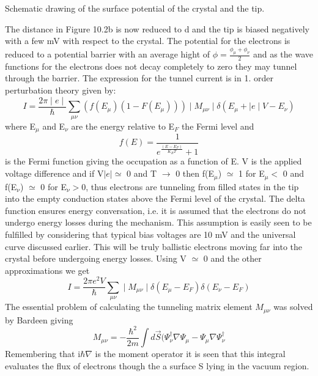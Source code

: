 \vspace*{11cm}

 Schematic drawing of the surface potential of the crystal and the tip.

\vspace{1cm}




The  distance in Figure 10.2b is now reduced to d and the tip is biased negatively with a few mV with respect to the crystal.
The potential for the electrons is reduced to a potential barrier with an average hight of $\phi = \frac{\phi_{\mu}   + \phi_{\nu}}{2}$ and as the wave functions for the electrons does not decay completely to zero they  may tunnel through the barrier. The expression for the tunnel current is in 1. order perturbation theory given by:
\begin{equation}
I=\frac{2\pi \mid e\mid }{\hbar}\sum_{\mu \nu}(f(E_\mu)(1-F(E_\mu)))\mid M_{\mu \nu} \mid  \delta (E_\mu + \mid e \mid V - E_\nu)
\end{equation}
where E$_{\mu}$ and E$_{\nu}$ are the energy relative to E$_F$ the Fermi level and
\begin{equation}
f(E) = \frac{1}{e^{\frac{(E-E_F)}{K_{B}T}} + 1}
\end{equation}
 is the Fermi function giving the occupation as a function of E. V is the applied voltage difference and if 
V$\mid e \mid \simeq $ 0 and T $\rightarrow$ 0 then f(E$_\mu$) $\simeq$ 1  for E$_\mu  < $ 0 and    f(E$_\nu$) $\simeq$ 0  for E$_\nu > 0$, thus electrons are tunneling from filled states in the  tip into the empty conduction states above the Fermi level of the  crystal. The delta function ensures energy conversation, i.e. it is assumed that the electrons do not undergo energy losses during the mechanism. This assumption is easily seen to be fulfilled  by  considering that typical bias voltages  are 10 mV and the universal curve discussed earlier. This will be truly ballistic electrons moving far into the crystal before undergoing energy losses. Using  V $\simeq$ 0 and the other  approximations we get 
\begin{equation}
I=\frac{2\pi  e^2 V }{\hbar}\sum_{\mu \nu}\mid M_{\mu \nu} \mid  \delta (E_\mu - E_F) \delta (E_\nu - E_F)
\end{equation}
The essential problem of calculating the tunneling matrix element $M_{\mu \nu}$ was solved by Bardeen \cite{Bardeen} giving
\begin{equation}
 M_{\mu \nu} = - \frac{\hbar^2}{2m} \int d\overrightarrow{S}(\Psi_ \nu^{\dag}\nabla\Psi_\mu-\Psi_\mu \nabla\Psi_\nu^{\dag}
\end{equation}
 Remembering  that i$\hbar \nabla$ is the moment operator it is seen that  this integral evaluates the flux of electrons though the  a surface S lying in the vacuum region.


